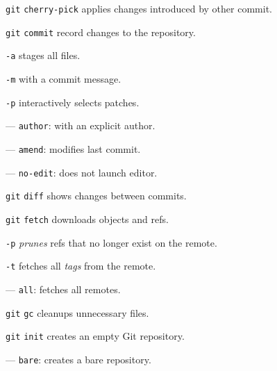 \documentclass{reference_card}
\begin{document}
\begin{multicols*}{3}
\begin{compactenum}
\item [\texttt{git}] \texttt{cherry-pick} applies changes introduced by other commit.
\end{compactenum}

\begin{compactenum}
\item [\texttt{git}] \texttt{commit} record changes to the repository.
\item [\texttt{-a}] stages all files.
\item [\texttt{-m}] with a commit message.
\item [\texttt{-p}] interactively selects patches.
\item [---] \texttt{author}: with an explicit author.
\item [---] \texttt{amend}: modifies last commit.
\item [---] \texttt{no-edit}: does not launch editor.
\end{compactenum}

\begin{compactenum}
\item [\texttt{git}] \texttt{diff} shows changes between commits.
\end{compactenum}

\begin{compactenum}
\item [\texttt{git}] \texttt{fetch} downloads objects and refs.
\item [\texttt{-p}] \emph{prunes} refs that no longer exist on the remote.
\item [\texttt{-t}] fetches all \emph{tags} from the remote.
\item [---] \texttt{all}: fetches all remotes.
\end{compactenum}

\begin{compactenum}
\item [\texttt{git}] \texttt{gc} cleanups unnecessary files.
\end{compactenum}

\begin{compactenum}
\item [\texttt{git}] \texttt{init} creates an empty Git repository.
\item [---] \texttt{bare}: creates a bare repository.
\end{compactenum}


\end{multicols*}
\end{document}
